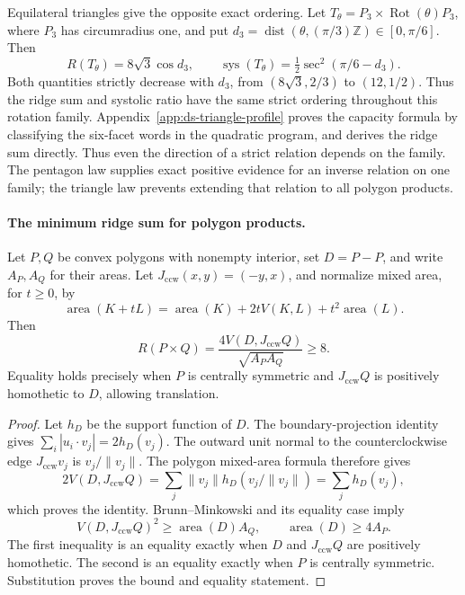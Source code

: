 Equilateral triangles give the opposite exact ordering. Let
$T_\theta=P_3\times\operatorname{Rot}(\theta)P_3$, where $P_3$ has
circumradius one, and put
$d_3=\operatorname{dist}(\theta,(\pi/3)\mathbb Z)\in[0,\pi/6]$. Then
\begin{equation}\label{eq:ds-triangle-profile}
 R(T_\theta)=8\sqrt3\cos d_3,
 \qquad
 \operatorname{sys}(T_\theta)=\tfrac12\sec^2(\pi/6-d_3).
\end{equation}
Both quantities strictly decrease with $d_3$, from $(8\sqrt3,2/3)$ to
$(12,1/2)$. Thus the ridge sum and systolic ratio have the same strict ordering
throughout this rotation family. Appendix~\ref{app:ds-triangle-profile}
proves the capacity formula by classifying the six-facet words in the
quadratic program, and derives the ridge sum directly. Thus even the direction of a strict relation depends on the family.
The pentagon law supplies exact positive evidence for an inverse relation
on one family; the triangle law prevents extending that relation to all
polygon products.

\paragraph{The minimum ridge sum for polygon products.}
Let $P,Q$ be convex polygons with nonempty interior, set $D=P-P$, and write
$A_P,A_Q$ for their areas. Let $J_{\mathrm{ccw}}(x,y)=(-y,x)$, and normalize mixed area, for $t\geq0$, by
\[
 \operatorname{area}(K+tL)=\operatorname{area}(K)+2tV(K,L)
                         +t^2\operatorname{area}(L).
\]
Then
\begin{equation}\label{eq:ds-product-ridge-minimum}
 R(P\times Q)=\frac{4V(D,J_{\mathrm{ccw}}Q)}{\sqrt{A_PA_Q}}\geq8.
\end{equation}
Equality holds precisely when $P$ is centrally symmetric and $J_{\mathrm{ccw}}Q$ is
positively homothetic to $D$, allowing translation.

\begin{proof}
Let $h_D$ be the support function of $D$. The boundary-projection identity
gives $\sum_i|u_i\cdot v_j|=2h_D(v_j)$. The outward unit normal to the
counterclockwise edge $J_{\mathrm{ccw}}v_j$ is $v_j/\|v_j\|$. The polygon mixed-area
formula therefore gives
\[
 2V(D,J_{\mathrm{ccw}}Q)=\sum_j\|v_j\|h_D(v_j/\|v_j\|)
          =\sum_j h_D(v_j),
\]
which proves the identity. Brunn--Minkowski and its equality case
\cite[Sections~3 and~5]{dsGardner2002} imply
\[
 V(D,J_{\mathrm{ccw}}Q)^2\geq\operatorname{area}(D)A_Q,
 \qquad \operatorname{area}(D)\geq4A_P.
\]
The first inequality is an equality exactly when $D$ and $J_{\mathrm{ccw}}Q$ are
positively homothetic. The second is an equality exactly when $P$ is
centrally symmetric. Substitution proves the bound and equality statement.
\end{proof}

